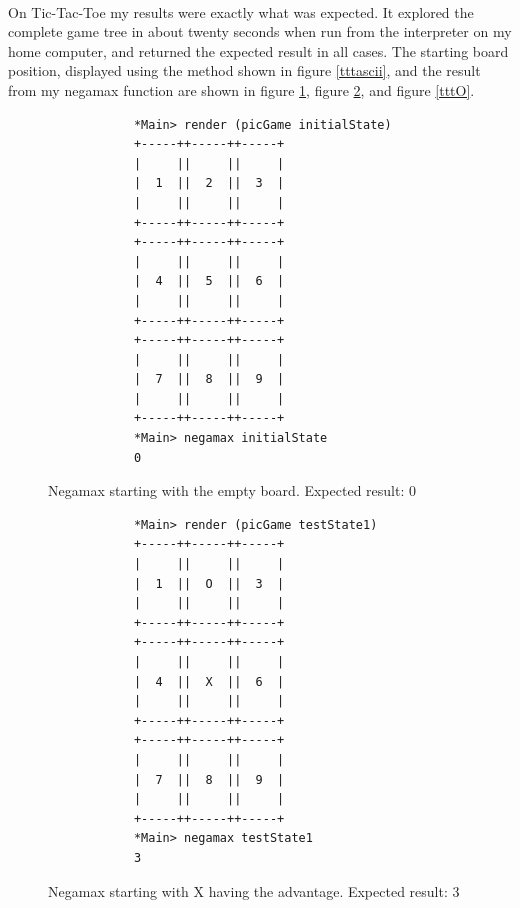 \documentclass[10pt]{article}
\begin{document}
    \paragraph{} On Tic-Tac-Toe my results were exactly what was expected.  It explored
    the complete game tree in about twenty seconds when run from the interpreter on my home
    computer, and returned the expected result in all cases.  The starting board 
    position, displayed using the method shown in figure \ref{tttascii}, and the result
    from my negamax function are shown in figure \ref{tttcat}, figure \ref{tttX}, and 
    figure \ref{tttO}.

    \begin{figure}[ht]
        \centering
        \begin{verbatim}
            *Main> render (picGame initialState)
            +-----++-----++-----+
            |     ||     ||     |
            |  1  ||  2  ||  3  |
            |     ||     ||     |
            +-----++-----++-----+
            +-----++-----++-----+
            |     ||     ||     |
            |  4  ||  5  ||  6  |
            |     ||     ||     |
            +-----++-----++-----+
            +-----++-----++-----+
            |     ||     ||     |
            |  7  ||  8  ||  9  |
            |     ||     ||     |
            +-----++-----++-----+
            *Main> negamax initialState 
            0    \end{verbatim}
        \caption{Negamax starting with the empty board.  Expected result: 0}\label{tttcat}
    \end{figure}

    \begin{figure}[ht]
        \centering
        \begin{verbatim}
            *Main> render (picGame testState1)
            +-----++-----++-----+
            |     ||     ||     |
            |  1  ||  O  ||  3  |
            |     ||     ||     |
            +-----++-----++-----+
            +-----++-----++-----+
            |     ||     ||     |
            |  4  ||  X  ||  6  |
            |     ||     ||     |
            +-----++-----++-----+
            +-----++-----++-----+
            |     ||     ||     |
            |  7  ||  8  ||  9  |
            |     ||     ||     |
            +-----++-----++-----+
            *Main> negamax testState1
            3    \end{verbatim}
        \caption{Negamax starting with X having the advantage. Expected result: 3}\label{tttX}
    \end{figure}
\end{document}
